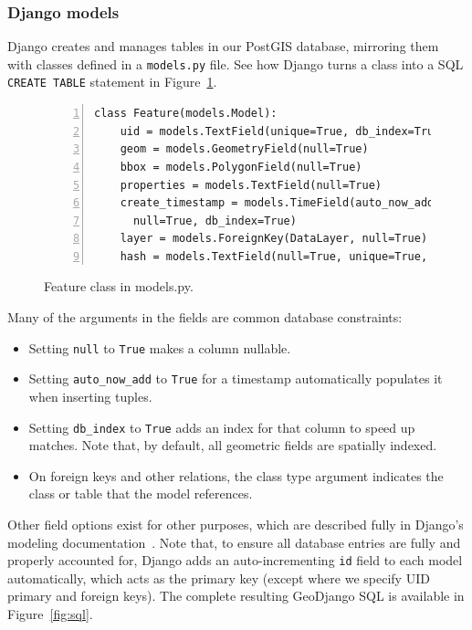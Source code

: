 \subsubsection{Django models}
Django creates and manages tables in our PostGIS database, mirroring them with classes defined in a \texttt{models.py} file. See how Django turns a class into a SQL \texttt{CREATE TABLE} statement in Figure~\ref{fig:feature}.

\begin{figure}[ht]
\begin{Verbatim}[samepage=true,baselinestretch=1,numbers=left,xleftmargin=12mm]
class Feature(models.Model):
    uid = models.TextField(unique=True, db_index=True)
    geom = models.GeometryField(null=True)
    bbox = models.PolygonField(null=True)
    properties = models.TextField(null=True)
    create_timestamp = models.TimeField(auto_now_add=True,
      null=True, db_index=True)
    layer = models.ForeignKey(DataLayer, null=True)
    hash = models.TextField(null=True, unique=True, db_index=True)
\end{Verbatim}
\caption{Feature class in models.py.}
\label{fig:feature}
\end{figure}


Many of the arguments in the fields are common database constraints:
\begin{itemize}
\item Setting \texttt{null} to \texttt{True} makes a column nullable.
\item Setting \texttt{auto\_now\_add} to \texttt{True} for a timestamp automatically populates it when inserting tuples.
\item Setting \texttt{db\_index} to \texttt{True} adds an index for that column to speed up matches. Note that, by default, all geometric fields are spatially indexed.
\item On foreign keys and other relations, the class type argument indicates the class or table that the model references.
\end{itemize}

Other field options exist for other purposes, which are described fully in Django's modeling documentation~\cite{Models}.  Note that, to ensure all database entries are fully and properly accounted for, Django adds an auto-incrementing \texttt{id} field to each model automatically, which acts as the primary key (except where we specify UID primary and foreign keys). The complete resulting GeoDjango SQL is available in Figure~\ref{fig:sql}.

